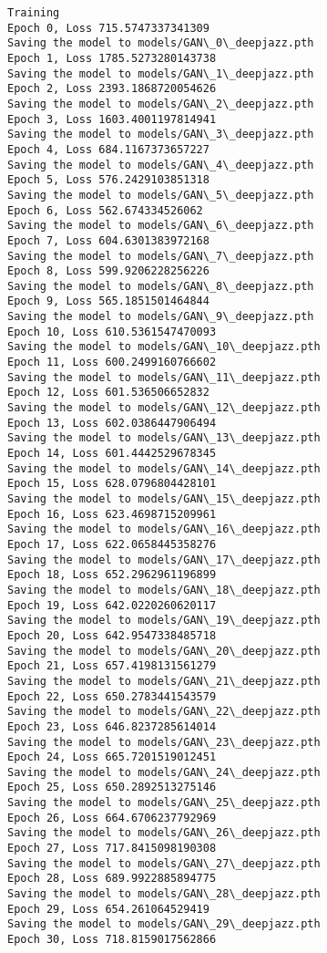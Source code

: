\documentclass[11pt]{article}
\begin{document}
    \begin{Verbatim}[commandchars=\\\{\}]
Training
Epoch 0, Loss 715.5747337341309
Saving the model to models/GAN\_0\_deepjazz.pth
Epoch 1, Loss 1785.5273280143738
Saving the model to models/GAN\_1\_deepjazz.pth
Epoch 2, Loss 2393.1868720054626
Saving the model to models/GAN\_2\_deepjazz.pth
Epoch 3, Loss 1603.4001197814941
Saving the model to models/GAN\_3\_deepjazz.pth
Epoch 4, Loss 684.1167373657227
Saving the model to models/GAN\_4\_deepjazz.pth
Epoch 5, Loss 576.2429103851318
Saving the model to models/GAN\_5\_deepjazz.pth
Epoch 6, Loss 562.674334526062
Saving the model to models/GAN\_6\_deepjazz.pth
Epoch 7, Loss 604.6301383972168
Saving the model to models/GAN\_7\_deepjazz.pth
Epoch 8, Loss 599.9206228256226
Saving the model to models/GAN\_8\_deepjazz.pth
Epoch 9, Loss 565.1851501464844
Saving the model to models/GAN\_9\_deepjazz.pth
Epoch 10, Loss 610.5361547470093
Saving the model to models/GAN\_10\_deepjazz.pth
Epoch 11, Loss 600.2499160766602
Saving the model to models/GAN\_11\_deepjazz.pth
Epoch 12, Loss 601.536506652832
Saving the model to models/GAN\_12\_deepjazz.pth
Epoch 13, Loss 602.0386447906494
Saving the model to models/GAN\_13\_deepjazz.pth
Epoch 14, Loss 601.4442529678345
Saving the model to models/GAN\_14\_deepjazz.pth
Epoch 15, Loss 628.0796804428101
Saving the model to models/GAN\_15\_deepjazz.pth
Epoch 16, Loss 623.4698715209961
Saving the model to models/GAN\_16\_deepjazz.pth
Epoch 17, Loss 622.0658445358276
Saving the model to models/GAN\_17\_deepjazz.pth
Epoch 18, Loss 652.2962961196899
Saving the model to models/GAN\_18\_deepjazz.pth
Epoch 19, Loss 642.0220260620117
Saving the model to models/GAN\_19\_deepjazz.pth
Epoch 20, Loss 642.9547338485718
Saving the model to models/GAN\_20\_deepjazz.pth
Epoch 21, Loss 657.4198131561279
Saving the model to models/GAN\_21\_deepjazz.pth
Epoch 22, Loss 650.2783441543579
Saving the model to models/GAN\_22\_deepjazz.pth
Epoch 23, Loss 646.8237285614014
Saving the model to models/GAN\_23\_deepjazz.pth
Epoch 24, Loss 665.7201519012451
Saving the model to models/GAN\_24\_deepjazz.pth
Epoch 25, Loss 650.2892513275146
Saving the model to models/GAN\_25\_deepjazz.pth
Epoch 26, Loss 664.6706237792969
Saving the model to models/GAN\_26\_deepjazz.pth
Epoch 27, Loss 717.8415098190308
Saving the model to models/GAN\_27\_deepjazz.pth
Epoch 28, Loss 689.9922885894775
Saving the model to models/GAN\_28\_deepjazz.pth
Epoch 29, Loss 654.261064529419
Saving the model to models/GAN\_29\_deepjazz.pth
Epoch 30, Loss 718.8159017562866

\end{Verbatim}
\end{document}
